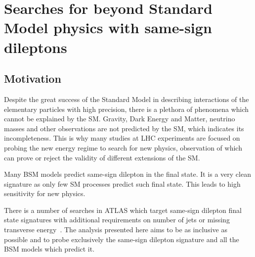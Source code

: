 \chapter{Searches for beyond Standard Model physics with same-sign dileptons}
\label{chap:SS}
\section{Motivation}

Despite the great success of the Standard Model in describing interactions of the elementary particles with high precision, there is a plethora of phenomena
which cannot be explained by the SM. Gravity, Dark Energy and Matter, neutrino masses and other observations are not predicted by the
SM, which indicates its incompleteness.
This is why many studies at LHC experiments are focused on probing the new energy regime to search for new physics, 
observation of which can prove or reject the validity of different extensions of the SM.

Many BSM models predict same-sign dilepton in the final state.
It is a very clean signature as only few SM processes predict such final state.
This leads to high sensitivity for new physics.

There is a number of searches in ATLAS which target same-sign dilepton final state signatures with additional requirements on number of jets or missing transverse energy~\cite{heavy_majorana_neutrino_paper,floderus_paper,Aad:2014pda}.
The analysis presented here aims to be as inclusive as possible and to probe exclusively the same-sign dilepton signature and all the BSM models which predict it.

